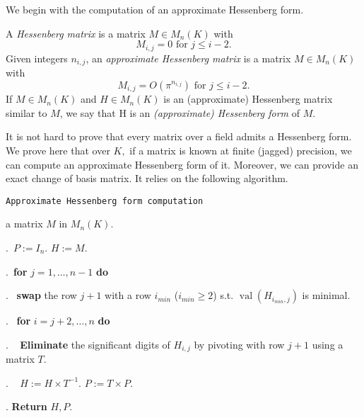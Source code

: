 \documentclass{sig-alternate-05-2015}
\DeclareMathOperator{\val}{val}
\begin{document}
We begin with the computation of
an approximate Hessenberg form.

\begin{deftn}
A \emph{Hessenberg matrix} is a matrix $M \in M_n(K)$ with
\[
M_{i,j}=0 \mbox{ for $j \le i-2$.}
\]
Given integers $n_{i,j}$, an \emph{approximate Hessenberg matrix}
is a matrix $M \in M_n(K)$ with
\[
M_{i,j} = O(\pi^{n_{i,j}}) \mbox{ for $j \le i-2$.}
\]
If $M \in M_n (K)$ and $H \in M_n (K)$ is an (approximate) Hessenberg matrix
similar to $M$, we say that H is an \emph{(approximate) Hessenberg form} of $M.$
\end{deftn}

It is not hard to prove that every matrix over a field admits
a Hessenberg form.
We prove here that over $K,$ if a matrix is 
known at finite (jagged) precision,
we can compute an approximate Hessenberg form of it.
Moreover, we can provide an exact change of basis matrix.
It relies on the following algorithm.


\noindent\hrulefill

 {\tt Approximate Hessenberg form computation}

 a matrix $M$ in $M_n(K).$

\smallskip

.\ $P:=I_n.$ \: $H:=M.$


.\ {\bf for} $j=1,\dots,n-1$ {\bf do} 

.\  \:  {\bf swap} the row $j+1$ with a row $i_{min}$ ($i_{min} \geq 2$) s.t. $\val(H_{i_{min},j})$ is minimal. 

.\  \:  {\bf for} $i=j+2,\dots,n$ {\bf do} 

. \ \: \:  \textbf{Eliminate} the significant digits of $H_{i,j}$ by pivoting with row $j+1$ 
using a matrix $T.$

. \ \: \:  $H:=H \times T^{-1}.$ \: $P:=T \times P.$

. \textbf{Return} $H,P.$

\vspace{-1ex}\noindent\hrulefill

\medskip
\end{document}
